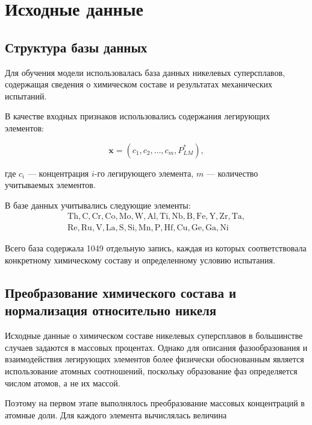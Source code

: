 \section{Исходные данные}

\subsection{Структура базы данных}

Для обучения модели использовалась база данных никелевых суперсплавов, 
содержащая сведения о химическом составе и результатах механических 
испытаний.

В качестве входных признаков использовались содержания легирующих элементов:

\begin{equation}
\mathbf{x} =
\left(
c_1, c_2, \ldots, c_m, P_{LM}^{*}
\right),
\end{equation}

где $c_i$ --- концентрация $i$-го легирующего элемента, 
$m$ --- количество учитываемых элементов.

В базе данных учитывались следующие элементы:
\begin{equation}
\begin{split}
\mathrm{Th, C, Cr, Co, Mo, W, Al, Ti, Nb, B, Fe, Y, Zr, Ta,} \\
\mathrm{Re, Ru, V, La, S, Si, Mn, P, Hf, Cu, Ge, Ga, Ni}
\end{split}
\end{equation}

Всего база содержала 1049 отдельную запись, каждая из которых 
соответствовала конкретному химическому составу и определенному 
условию испытания.

\subsection{Преобразование химического состава и нормализация относительно никеля}

Исходные данные о химическом составе никелевых суперсплавов в 
большинстве случаев задаются в массовых процентах. Однако для 
описания фазообразования и взаимодействия легирующих элементов 
более физически обоснованным является использование атомных 
соотношений, поскольку образование фаз определяется числом атомов, а 
не их массой.

Поэтому на первом этапе выполнялось преобразование массовых 
концентраций в атомные доли. Для каждого элемента вычислялась 
величина

